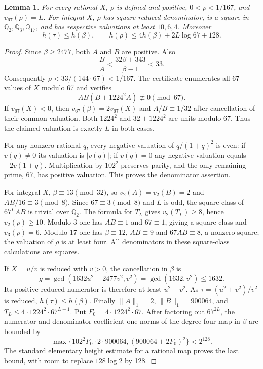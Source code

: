 \documentclass[11pt]{article}
\newtheorem{lemma}[theorem]{Lemma}
\newcommand{\Q}{\mathbb Q}\newcommand{\Z}{\mathbb Z}
\begin{document}
\begin{lemma}\label{lem:scalar}
For every rational $X$, $\rho$ is defined and positive,
$0<\rho<1/167$, and $v_{67}(\rho)=L$.
For integral $X$, $\rho$ has square reduced denominator, is a square in
$\Q_2,\Q_3,\Q_{17}$, and has respective valuations at least $10,6,4$.
Moreover
\[
 h(\tau)\le h(\beta),\qquad
 h(\rho)\le4h(\beta)+2L\log67+128.
\]
\end{lemma}
\begin{proof}
Since $\beta\ge2477$, both $A$ and $B$ are positive. Also
\[
 \frac BA<\frac{32\beta+343}{\beta-1}<33.
\]
Consequently $\rho<33/(144\cdot67)<1/167$.
The certificate enumerates all 67 values of $X$ modulo 67 and verifies
\[
 AB(B+1224^2A)\not\equiv0\pmod {67}.
\]
If $v_{67}(X)<0$, then $v_{67}(\beta)=2v_{67}(X)$ and
$A/B\equiv1/32$ after cancellation of their common valuation.
Both $1224^2$ and $32+1224^2$ are units modulo 67. Thus the claimed
valuation is exactly $L$ in both cases.

For any nonzero rational $q$, every negative valuation of
$q/(1+q)^2$ is even: if $v(q)\ne0$ its valuation is $|v(q)|$;
if $v(q)=0$ any negative valuation equals $-2v(1+q)$.
Multiplication by $102^2$ preserves parity, and the only remaining
prime, 67, has positive valuation. This proves the denominator assertion.

For integral $X$, $\beta\equiv13\pmod {32}$, so
$v_2(A)=v_2(B)=2$ and $AB/16\equiv3\pmod8$.
Since $67\equiv3\pmod8$ and $L$ is odd, the square class of
$67^LAB$ is trivial over $\Q_2$. The formula for $T_L$ gives
$v_2(T_L)\ge8$, hence $v_2(\rho)\ge10$.
Modulo 3 one has $AB\equiv1$ and $67\equiv1$, giving a square
class and $v_3(\rho)=6$. Modulo 17 one has $\beta\equiv12$,
$AB\equiv9$ and $67AB\equiv8$, a nonzero square; the valuation
of $\rho$ is at least four. All denominators in these square-class
calculations are squares.

If $X=u/v$ is reduced with $v>0$, the cancellation in $\beta$ is
\[
 g=\gcd(1632u^2+2477v^2,v^2)=\gcd(1632,v^2)\le1632.
\]
Its positive reduced numerator is therefore at least $u^2+v^2$.
As $\tau=(u^2+v^2)/v^2$ is reduced, $h(\tau)\le h(\beta)$.
Finally $\|A\|_1=2$, $\|B\|_1=900064$, and
$T_L\le 4\cdot1224^2\cdot67^{L+1}$. Put
$F_0=4\cdot1224^2\cdot67$. After factoring out $67^{2L}$,
the numerator and denominator coefficient one-norms of the degree-four
map in $\beta$ are bounded by
\[
 \max\{102^2F_0\cdot2\cdot900064,
              (900064+2F_0)^2\}<2^{128}.
\]
The standard elementary height estimate for a rational map proves the
last bound, with room to replace $128\log2$ by 128.
\end{proof}
\end{document}

